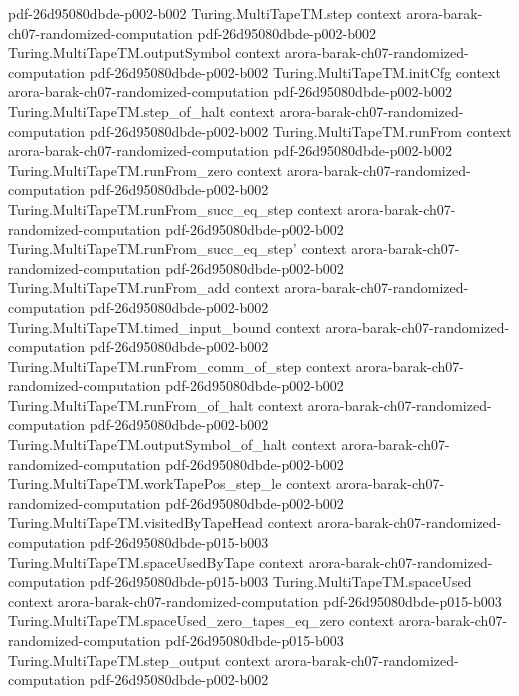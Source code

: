 \begin{theorem}
  {pdf-26d95080dbde-p002-b002}
\proofstep
  {Turing.MultiTapeTM.step}
  {context}
  {arora-barak-ch07-randomized-computation}
  {pdf-26d95080dbde-p002-b002}
\proofstep
  {Turing.MultiTapeTM.outputSymbol}
  {context}
  {arora-barak-ch07-randomized-computation}
  {pdf-26d95080dbde-p002-b002}
\proofstep
  {Turing.MultiTapeTM.initCfg}
  {context}
  {arora-barak-ch07-randomized-computation}
  {pdf-26d95080dbde-p002-b002}
\proofstep
  {Turing.MultiTapeTM.step_of_halt}
  {context}
  {arora-barak-ch07-randomized-computation}
  {pdf-26d95080dbde-p002-b002}
\proofstep
  {Turing.MultiTapeTM.runFrom}
  {context}
  {arora-barak-ch07-randomized-computation}
  {pdf-26d95080dbde-p002-b002}
\proofstep
  {Turing.MultiTapeTM.runFrom_zero}
  {context}
  {arora-barak-ch07-randomized-computation}
  {pdf-26d95080dbde-p002-b002}
\proofstep
  {Turing.MultiTapeTM.runFrom_succ_eq_step}
  {context}
  {arora-barak-ch07-randomized-computation}
  {pdf-26d95080dbde-p002-b002}
\proofstep
  {Turing.MultiTapeTM.runFrom_succ_eq_step'}
  {context}
  {arora-barak-ch07-randomized-computation}
  {pdf-26d95080dbde-p002-b002}
\proofstep
  {Turing.MultiTapeTM.runFrom_add}
  {context}
  {arora-barak-ch07-randomized-computation}
  {pdf-26d95080dbde-p002-b002}
\proofstep
  {Turing.MultiTapeTM.timed_input_bound}
  {context}
  {arora-barak-ch07-randomized-computation}
  {pdf-26d95080dbde-p002-b002}
\proofstep
  {Turing.MultiTapeTM.runFrom_comm_of_step}
  {context}
  {arora-barak-ch07-randomized-computation}
  {pdf-26d95080dbde-p002-b002}
\proofstep
  {Turing.MultiTapeTM.runFrom_of_halt}
  {context}
  {arora-barak-ch07-randomized-computation}
  {pdf-26d95080dbde-p002-b002}
\proofstep
  {Turing.MultiTapeTM.outputSymbol_of_halt}
  {context}
  {arora-barak-ch07-randomized-computation}
  {pdf-26d95080dbde-p002-b002}
\proofstep
  {Turing.MultiTapeTM.workTapePos_step_le}
  {context}
  {arora-barak-ch07-randomized-computation}
  {pdf-26d95080dbde-p002-b002}
\proofstep
  {Turing.MultiTapeTM.visitedByTapeHead}
  {context}
  {arora-barak-ch07-randomized-computation}
  {pdf-26d95080dbde-p015-b003}
\proofstep
  {Turing.MultiTapeTM.spaceUsedByTape}
  {context}
  {arora-barak-ch07-randomized-computation}
  {pdf-26d95080dbde-p015-b003}
\proofstep
  {Turing.MultiTapeTM.spaceUsed}
  {context}
  {arora-barak-ch07-randomized-computation}
  {pdf-26d95080dbde-p015-b003}
\proofstep
  {Turing.MultiTapeTM.spaceUsed_zero_tapes_eq_zero}
  {context}
  {arora-barak-ch07-randomized-computation}
  {pdf-26d95080dbde-p015-b003}
\proofstep
  {Turing.MultiTapeTM.step_output}
  {context}
  {arora-barak-ch07-randomized-computation}
  {pdf-26d95080dbde-p002-b002}

\end{theorem}
